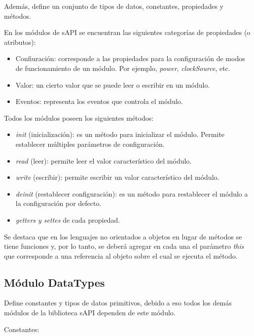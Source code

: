 Además, define un conjunto de tipos de datos, constantes, propiedades y métodos.

En los módulos de sAPI se encuentran las siguientes categorías de propiedades (o atributos):

\begin{itemize}
\item
Confiuración: corresponde a las propiedades para la configuración de modos de funcionamiento de un módulo. Por ejemplo, \emph{power}, \emph{clockSource}, etc.
\item
Valor: un cierto valor que se puede leer o escribir en un módulo.
\item
Eventos: representa los eventos que controla el módulo.
\end{itemize}

Todos los módulos poseen los siguientes métodos:

\begin{itemize}
\item
\emph{init} (inicialización): es un método para inicializar el módulo. Permite establecer múltiples parámetros de configuración.
\item
\emph{read} (leer): permite leer el valor característico del módulo.
\item
\emph{write} (escribir): permite escribir un valor característico del módulo.
\item
\emph{deinit} (restablecer configuración): es un método para restablecer el módulo a la configuración por defecto.
\item
\emph{getters y settes} de cada propiedad.
\end{itemize}

Se destaca que en los lenguajes no orientados a objetos en lugar de métodos se tiene funciones y, por lo tanto, se deberá agregar en cada una el parámetro \emph{this} que corresponde a una referencia al objeto sobre el cual se ejecuta el método.

\subsection{Módulo DataTypes}

Define constantes y tipos de datos primitivos, debido a eso todos los demás módulos de la biblioteca sAPI dependen de este módulo.

Constantes:

